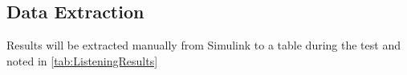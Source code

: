 
\subsection{Data Extraction}
Results will be extracted manually from Simulink to a table during the test and noted in \autoref{tab:ListeningResults}

